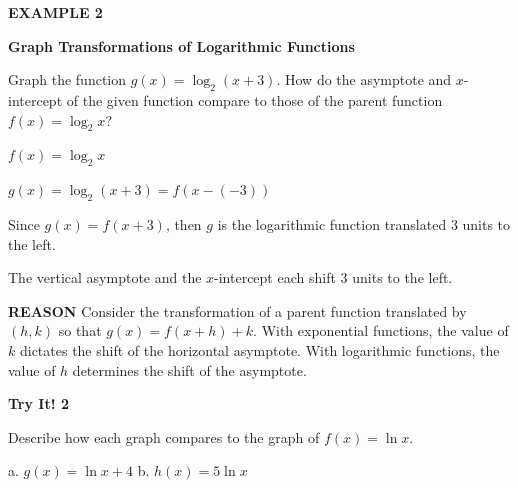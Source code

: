 \documentclass{article}
\newenvironment{concept-box}{}{}
\newenvironment{example}[1]{\textbf{EXAMPLE #1}\par}{\par}
\newenvironment{tryit}[1]{\textbf{Try It! #1}\par}{\par}
\begin{document}
\begin{example}{2}
\textbf{Graph Transformations of Logarithmic Functions}

Graph the function $g(x) = \log_2(x + 3)$. How do the asymptote and $x$-intercept of the given function compare to those of the parent function $f(x) = \log_2 x$?

$f(x) = \log_2 x$

$g(x) = \log_2(x + 3) = f(x - (-3))$

Since $g(x) = f(x + 3)$, then $g$ is the logarithmic function translated $3$ units to the left. 

The vertical asymptote and the $x$-intercept each shift $3$ units to the left.

\begin{center}
\end{center}

\begin{concept-box}
\textbf{REASON}
Consider the transformation of a parent function translated by $(h, k)$ so that $g(x) = f(x + h) + k$. With exponential functions, the value of $k$ dictates the shift of the horizontal asymptote. With logarithmic functions, the value of $h$ determines the shift of the asymptote.
\end{concept-box}
\end{example}

\begin{tryit}{2}
Describe how each graph compares to the graph of $f(x) = \ln x$.

a. $g(x) = \ln x + 4$ \qquad b. $h(x) = 5 \ln x$
\end{tryit}
\end{document}
